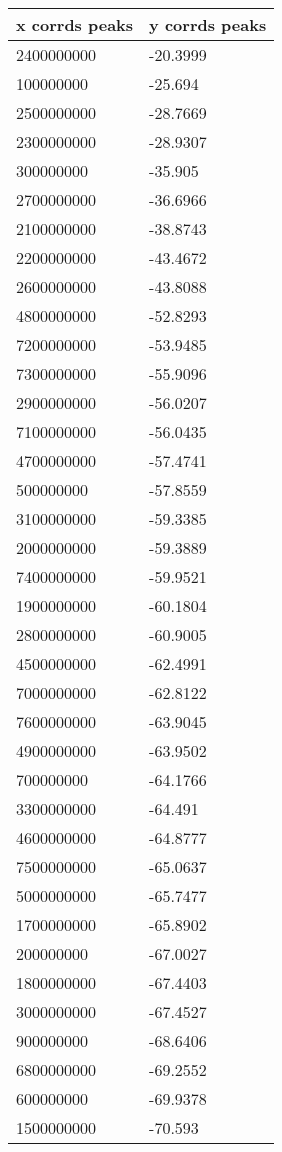 \begin{tabular}{ll}
x corrds peaks & y corrds peaks \\ 
\hline 
2400000000 & -20.3999 \\ 
100000000 & -25.694 \\ 
2500000000 & -28.7669 \\ 
2300000000 & -28.9307 \\ 
300000000 & -35.905 \\ 
2700000000 & -36.6966 \\ 
2100000000 & -38.8743 \\ 
2200000000 & -43.4672 \\ 
2600000000 & -43.8088 \\ 
4800000000 & -52.8293 \\ 
7200000000 & -53.9485 \\ 
7300000000 & -55.9096 \\ 
2900000000 & -56.0207 \\ 
7100000000 & -56.0435 \\ 
4700000000 & -57.4741 \\ 
500000000 & -57.8559 \\ 
3100000000 & -59.3385 \\ 
2000000000 & -59.3889 \\ 
7400000000 & -59.9521 \\ 
1900000000 & -60.1804 \\ 
2800000000 & -60.9005 \\ 
4500000000 & -62.4991 \\ 
7000000000 & -62.8122 \\ 
7600000000 & -63.9045 \\ 
4900000000 & -63.9502 \\ 
700000000 & -64.1766 \\ 
3300000000 & -64.491 \\ 
4600000000 & -64.8777 \\ 
7500000000 & -65.0637 \\ 
5000000000 & -65.7477 \\ 
1700000000 & -65.8902 \\ 
200000000 & -67.0027 \\ 
1800000000 & -67.4403 \\ 
3000000000 & -67.4527 \\ 
900000000 & -68.6406 \\ 
6800000000 & -69.2552 \\ 
600000000 & -69.9378 \\ 
1500000000 & -70.593 \\ 

\end{tabular}

